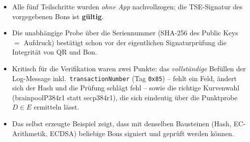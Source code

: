 \documentclass[
    fontsize=12pt,          %
    paper=a4,               %
    numbers=noenddot,       %
    listof=totoc,           %
    listof=entryprefix,     %
    listof=nochaptergap,    %
    bibliography=totoc,     %
    parskip=half,           %
    openany                 %
]{scrbook}
\begin{document}
\begin{itemize}
    \item Alle fünf Teilschritte wurden \emph{ohne App} nachvollzogen; die TSE-Signatur des
          vorgegebenen Bons ist \textbf{gültig}.
    \item Die unabhängige Probe über die Seriennummer (SHA-256 des Public Keys $=$ Aufdruck)
          bestätigt schon vor der eigentlichen Signaturprüfung die Integrität von QR und Bon.
    \item Kritisch für die Verifikation waren zwei Punkte: das \emph{vollständige} Befüllen der
          Log-Message inkl.\ \texttt{transactionNumber} (Tag \texttt{0x85}) -- fehlt ein Feld,
          ändert sich der Hash und die Prüfung schlägt fehl -- sowie die richtige Kurvenwahl
          (brainpoolP384r1 statt secp384r1), die sich eindeutig über die Punktprobe $D \in E$
          ermitteln lässt.
    \item Das selbst erzeugte Beispiel zeigt, dass mit denselben Bausteinen (Hash, EC-Arithmetik,
          ECDSA) beliebige Bons signiert und geprüft werden können.
\end{itemize}

\end{document}
